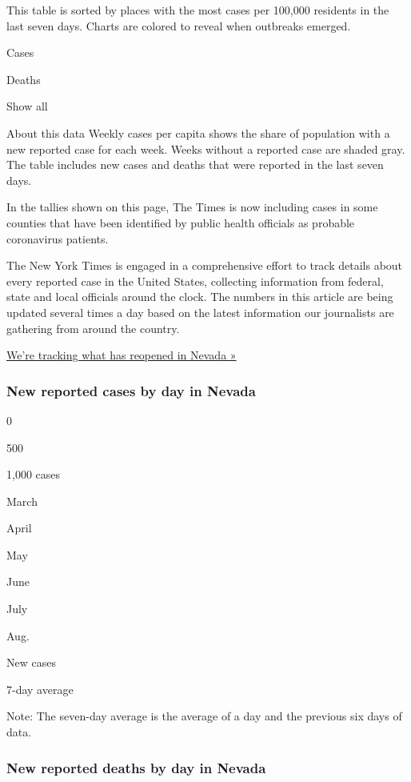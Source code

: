 This table is sorted by places with the most cases per 100,000 residents
in the last seven days. Charts are colored to reveal when outbreaks
emerged.

Cases

Deaths

Show all

About this data Weekly cases per capita shows the share of population
with a new reported case for each week. Weeks without a reported case
are shaded gray. The table includes new cases and deaths that were
reported in the last seven days.

In the tallies shown on this page, The Times is now including cases in
some counties that have been identified by public health officials as
probable coronavirus patients.

The New York Times is engaged in a comprehensive effort to track details
about every reported case in the United States, collecting information
from federal, state and local officials around the clock. The numbers in
this article are being updated several times a day based on the latest
information our journalists are gathering from around the country.

\href{https://www.nytimes.com/interactive/2020/us/states-reopen-map-coronavirus.html}{We're
tracking what has reopened in Nevada »}

\hypertarget{new-reported-cases-by-day-in-nevada}{%
\subsubsection{New reported cases by day in
Nevada}\label{new-reported-cases-by-day-in-nevada}}

0

500

1,000 cases

March

April

May

June

July

Aug.

New cases

7-day average

Note: The seven-day average is the average of a day and the previous six
days of data.

\hypertarget{new-reported-deaths-by-day-in-nevada}{%
\subsubsection{New reported deaths by day in
Nevada}\label{new-reported-deaths-by-day-in-nevada}}

